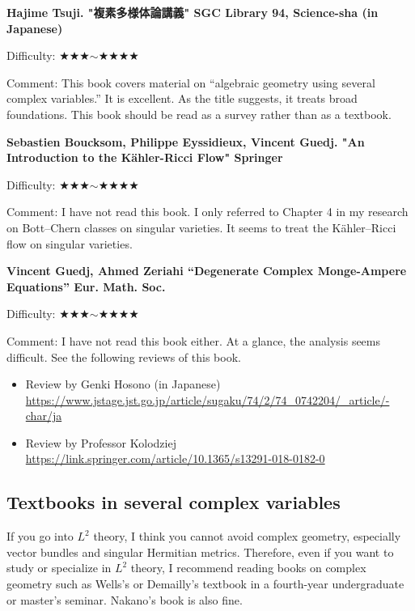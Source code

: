 \textbf{Hajime Tsuji. "複素多様体論講義" SGC Library 94, Science-sha  (in Japanese)}  \vspace{-6pt} 

Difficulty: ★★★$\sim$★★★★ \vspace{-6pt} 

Comment: This book covers material on ``algebraic geometry using several complex variables.'' It is excellent. As the title suggests, it treats broad foundations. This book should be read as a survey rather than as a textbook.
\vspace{8pt}

\textbf{Sebastien Boucksom, Philippe Eyssidieux, Vincent Guedj. "An Introduction to the Kähler-Ricci Flow" Springer}  \vspace{-6pt} 

Difficulty: ★★★$\sim$★★★★ \vspace{-6pt} 

Comment: I have not read this book. I only referred to Chapter 4 in my research on Bott--Chern classes on singular varieties. It seems to treat the K\"ahler--Ricci flow on singular varieties.

\textbf{Vincent Guedj, Ahmed Zeriahi “Degenerate Complex Monge-Ampere Equations”  Eur. Math. Soc.}
 \vspace{-6pt} 

Difficulty: ★★★$\sim$★★★★ \vspace{-6pt} 

Comment: I have not read this book either. At a glance, the analysis seems difficult. See the following reviews of this book.
\vspace{-8pt}
\begin{itemize}[left=0pt]
  \setlength{\parskip}{0cm} %
  \setlength{\itemsep}{0cm} %
\item Review by Genki Hosono (in Japanese) \url{https://www.jstage.jst.go.jp/article/sugaku/74/2/74_0742204/_article/-char/ja}
\item Review by Professor Kolodziej \url{https://link.springer.com/article/10.1365/s13291-018-0182-0}
\end{itemize}
\subsection{Textbooks in several complex variables}

If you go into $L^2$ theory, I think you cannot avoid complex geometry, especially vector bundles and singular Hermitian metrics. Therefore, even if you want to study or specialize in $L^2$ theory, I recommend reading books on complex geometry such as Wells's or Demailly's textbook in a fourth-year undergraduate or master's seminar. Nakano's book is also fine.

